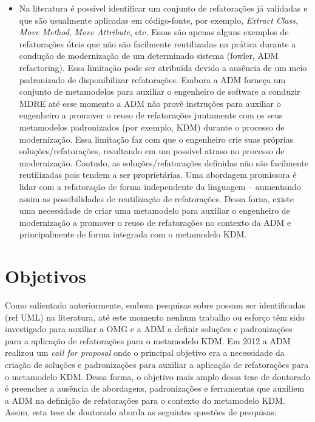 \begin{itemize}
	\item Na literatura é possível identificar um conjunto de refatorações já validadas e que são usualmente aplicadas em código-fonte, por exemplo, \textit{Extract Class}, \textit{Move Method}, \textit{Move Attribute}, etc. Essas são apenas alguns exemplos de refatorações úteis que não são facilmente reutilizadas na prática durante a condução de modernização de um determinado sistema (fowler, ADM refactoring). Essa limitação pode ser atribuída devido a ausência de um meio padronizado de disponibilizar refatorações. Embora a ADM forneça um conjunto de metamodelos para auxiliar o engenheiro de software a conduzir MDRE até esse momento a ADM não provê instruções para auxiliar o engenheiro a promover o reuso de refatorações juntamente com os seus metamodelos padronizados (por exemplo, KDM) durante o processo de modernização. Essa limitação faz com que o engenheiro crie suas próprias soluções/refatorações, resultando em um possível atraso no processo de modernização. Contudo, as soluções/refatorações  definidas não são facilmente reutilizadas pois tendem a ser proprietárias. Uma abordagem promissora é lidar com a refatoração de forma independente da linguagem – aumentando assim as possibilidades de reutilização de refatorações. Dessa forna, existe uma necessidade de criar uma metamodelo para auxiliar o engenheiro de modernização a promover o reuso de refatorações no contexto da ADM e principalmente de forma integrada com o metamodelo KDM. 

\end{itemize}

\section{Objetivos}\label{sec:objetivos}

Como salientado anteriormente, embora pesquisas sobre  possam ser identificadas (ref UML) na literatura, até este momento nenhum trabalho ou esforço têm sido investigado para auxiliar a OMG e a ADM a definir soluções e padronizações para a aplicação de refatorações para o metamodelo KDM. Em 2012 a ADM realizou um \emph{call for proposal} onde o principal objetivo era a necessidade da criação de soluções e padronizações para auxiliar a aplicação de refatorações para o metamodelo KDM. Dessa forma, o objetivo mais amplo dessa tese de doutorado é preencher a ausência de abordagens, padronizações e ferramentas que auxiliem a ADM na definição de refatorações para o contexto do metamodelo KDM. Assim, esta tese de doutorado aborda as seguintes questões de pesquisas:

